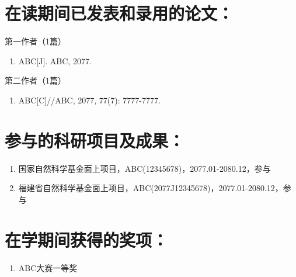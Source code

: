 \documentclass[engmaster]{thesis}
\begin{document}
\begin{thesisAccomplish}
    \section*{\heiti\fontsize{14pt}{16.8pt}\selectfont 在读期间已发表和录用的论文：} 
    \hspace{-26pt} 第一作者（1篇）
    \begin{enumerate}[labelindent=0pt, leftmargin=*]
        \item ABC[J]. ABC, 2077.
    \end{enumerate}
    第二作者（1篇）
    \begin{enumerate}[labelindent=0pt, leftmargin=*]
        \item ABC[C]//ABC, 2077, 77(7): 7777-7777.
    \end{enumerate}

    \section*{\heiti\fontsize{14pt}{16.8pt}\selectfont 参与的科研项目及成果：} 
    \begin{enumerate}[labelindent=0pt, leftmargin=*]
        \item 国家自然科学基金面上项目，ABC(12345678)，2077.01-2080.12，参与
        \item 福建省自然科学基金面上项目，ABC(2077J12345678)，2077.01-2080.12，参与
    \end{enumerate}

    \section*{\heiti\fontsize{14pt}{16.8pt}\selectfont 在学期间获得的奖项：} 
    \begin{enumerate}[labelindent=0pt, leftmargin=*]
        \item ABC大赛一等奖
    \end{enumerate}
\end{thesisAccomplish}
\end{document}
